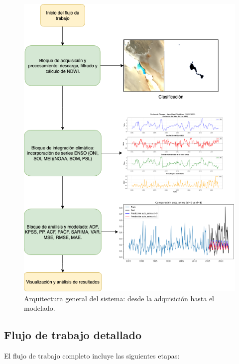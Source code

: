 \begin{figure}[htpb]
	\centering
	\includegraphics[scale=.6]{Figures/Arqui_TTFB.png}
	\caption{Arquitectura general del sistema: desde la adquisición hasta el modelado.}
	\label{fig:arquitectura_general}
\end{figure}


\subsection*{Flujo de trabajo detallado}

El flujo de trabajo completo incluye las siguientes etapas:

